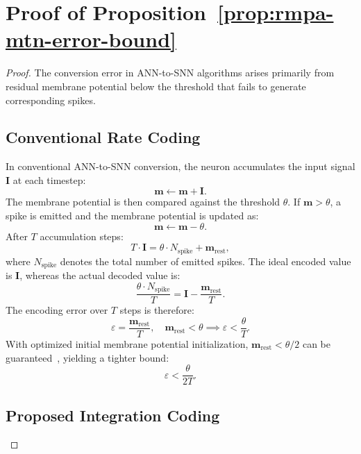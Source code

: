 \appendix

\section{Proof of Proposition~\ref{prop:rmpa-mtn-error-bound}\label{sec:error}}
\begin{proof}
The conversion error in ANN-to-SNN algorithms arises primarily from residual membrane potential below the threshold that fails to generate corresponding spikes.

\subsection*{Conventional Rate Coding}

In conventional ANN-to-SNN conversion, the neuron accumulates the input signal $\mathbf{I}$ at each timestep:
\[
\mathbf{m} \leftarrow \mathbf{m} + \mathbf{I}.
\]
The membrane potential is then compared against the threshold $\theta$. If $\mathbf{m} > \theta$, a spike is emitted and the membrane potential is updated as:
\[
\mathbf{m} \leftarrow \mathbf{m} - \theta.
\]
After $T$ accumulation steps:
\[
T \cdot \mathbf{I} = \theta \cdot N_{\text{spike}} + \mathbf{m}_{\text{rest}},
\]
where $N_{\text{spike}}$ denotes the total number of emitted spikes. The ideal encoded value is $\mathbf{I}$, whereas the actual decoded value is:
\[
\frac{\theta \cdot N_{\text{spike}}}{T} = \mathbf{I} - \frac{\mathbf{m}_{\text{rest}}}{T}.
\]
The encoding error over $T$ steps is therefore:
\[
\varepsilon = \frac{\mathbf{m}_{\text{rest}}}{T}, \quad \mathbf{m}_{\text{rest}} < \theta \implies \varepsilon < \frac{\theta}{T}.
\]
With optimized initial membrane potential initialization, $\mathbf{m}_{\text{rest}} < \theta/2$ can be guaranteed~\cite{hao2023bridging}, yielding a tighter bound:
\[
\varepsilon < \frac{\theta}{2T}.
\]

\subsection*{Proposed Integration Coding}


\end{proof}

